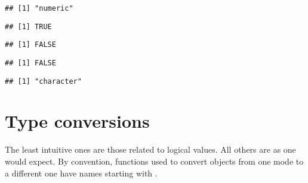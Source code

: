 \documentclass[paper=a4,headsepline,BCOR=12mm,twoside,open=right,%
titlepage,headings=small,fontsize=10pt,index=totoc,bibliography=totoc,%
captions=tableheading,captions=nooneline]{scrbook}\usepackage{knitr}
\begin{document}
\begin{knitrout}\footnotesize
{}\color{fgcolor}\begin{kframe}
\begin{alltt}
 \hlkwb{<-} \hlopt{:}
\end{alltt}
\begin{verbatim}
## [1] "numeric"
\end{verbatim}
\begin{alltt}
\end{alltt}
\begin{verbatim}
## [1] TRUE
\end{verbatim}
\begin{alltt}
\end{alltt}
\begin{verbatim}
## [1] FALSE
\end{verbatim}
\begin{alltt}
\end{alltt}
\begin{verbatim}
## [1] FALSE
\end{verbatim}
\begin{alltt}
 \hlkwb{<-} 
\end{alltt}
\begin{verbatim}
## [1] "character"
\end{verbatim}
\end{kframe}
\end{knitrout}

\section{Type conversions}

The least intuitive ones are those related to logical values. All others are as one would expect. By convention, functions used to convert objects from one mode to a different one have names starting with .
\end{document}
